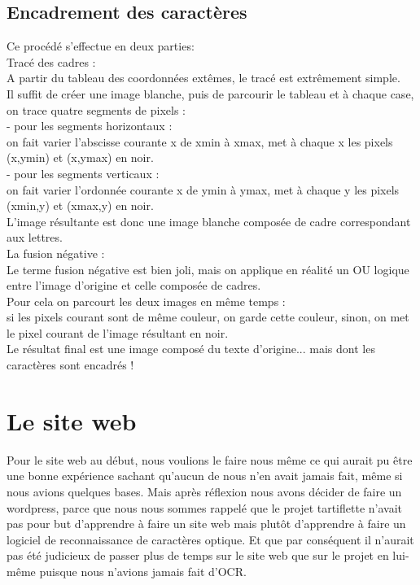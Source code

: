 \documentclass [french,12pt]{article}
\begin{document}
\subsection{Encadrement des caractères}

Ce procédé s'effectue en deux parties:
\\
Tracé des cadres :
\\
		A partir du tableau des coordonnées extêmes, le tracé est extrêmement simple.
\\
		Il suffit de créer une image blanche, puis de parcourir le tableau et à chaque case, on trace quatre segments de pixels :
\\
- pour les segments horizontaux :
\\
			on fait varier l'abscisse courante x de xmin à xmax,
			met à chaque x les pixels (x,ymin) et (x,ymax) en noir.
\\
- pour les segments verticaux :
\\
on fait varier l'ordonnée courante x de ymin à ymax,
met à chaque y les pixels (xmin,y) et (xmax,y) en noir.
\\
		L'image résultante est donc une image blanche composée de cadre correspondant aux lettres.
\\
La fusion négative :
\\
		Le terme fusion négative est bien joli, mais on applique en réalité un OU logique 	entre l'image d'origine et celle composée de cadres.
\\
           Pour cela on parcourt les deux images en même temps :
\\
                    si les pixels courant sont de même couleur, on garde cette couleur,
                    sinon, on met le pixel courant de l'image résultant en noir.
\\
		Le résultat final est une image composé du texte d'origine... mais dont les caractères sont encadrés !

\section{Le site web}

Pour le site web au début, nous voulions le faire nous même ce qui aurait pu être une bonne expérience sachant qu’aucun de nous n’en avait jamais fait, même si nous avions quelques bases. Mais après réflexion nous avons décider de faire un wordpress, parce que nous nous sommes rappelé que le projet tartiflette n’avait pas pour but d’apprendre à faire un site web mais plutôt d’apprendre à faire un logiciel de reconnaissance de caractères optique. Et que par conséquent il n’aurait pas été judicieux de passer plus de temps sur le site web que sur le projet en lui-même puisque nous n'avions jamais fait d'OCR.
\end{document}
